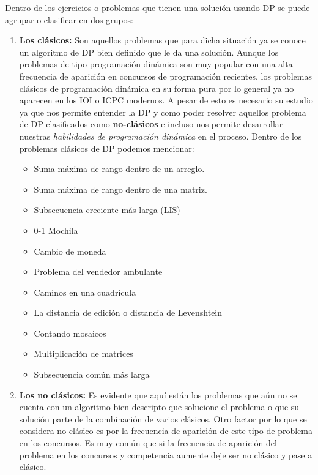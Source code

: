 Dentro de los ejercicios o problemas que tienen una solución usando DP se puede agrupar o clasificar en dos grupos:

\begin{enumerate}
	\item \textbf{Los clásicos:} Son aquellos problemas que para dicha situación ya se conoce un algoritmo de DP bien definido que le da una solución. Aunque los problemas de tipo programación dinámica son muy popular con una alta frecuencia de aparición en concursos de programación recientes, los problemas clásicos de programación dinámica en su forma pura por lo general ya no aparecen en los IOI o ICPC modernos. A pesar de esto es necesario su estudio ya que nos permite entender la DP y como poder resolver aquellos problema de DP clasificados como \textbf{no-clásicos} e incluso nos permite desarrollar nuestras \emph{habilidades de programación dinámica} en el proceso. Dentro de los problemas clásicos de DP podemos mencionar:
	
	\begin{itemize}
		\item Suma máxima de rango dentro de un arreglo.
		\item Suma máxima de rango dentro de una matriz.
		\item Subsecuencia creciente más larga (LIS)
		\item 0-1 Mochila 
		\item Cambio de moneda
		\item Problema del vendedor ambulante
		\item Caminos en una cuadrícula
		\item La distancia de edición o distancia de Levenshtein
		\item Contando mosaicos
		\item Multiplicación de matrices
		\item Subsecuencia común más larga
	\end{itemize}
	
	\item \textbf{Los no clásicos:} Es evidente que aquí están los problemas que aún no se cuenta con un algoritmo bien descripto que solucione el problema o que su solución parte de la combinación de varios clásicos. Otro factor por lo que se considera no-clásico es por la frecuencia de aparición de este tipo de problema en los concursos. Es muy común que si la frecuencia de aparición del problema en los concursos y competencia aumente deje ser no clásico y pase a clásico.   
\end{enumerate}

 